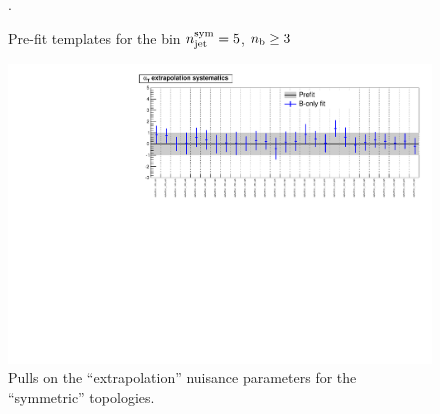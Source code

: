 \newpage
\begin{figure}[h!]
\caption{Pre-fit \MHT templates for the bin $\nj^{\mathrm{sym}}=5$, $\nb\ge 3$ \label{fig:preFitShapes_ge3b_ge5j}}.
\begin{center}
    \hspace{1cm}
\end{center}
\end{figure}




\newpage
\begin{landscape}
\begin{figure}[h!]
\caption{Pulls on the ``\alt extrapolation'' nuisance parameters for the ``symmetric'' topologies.\label{fig:nuisPull_alphaT_sym}}
    \includegraphics[width=\linewidth]{figures/postFitResults/nuisances/alphaT_sym_ALL_nuisances.pdf}
\end{figure}
\end{landscape}



